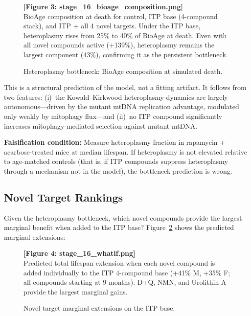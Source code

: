 \documentclass[11pt]{article}
\begin{document}
\begin{figure}[ht]
\centering
\textbf{[Figure 3: stage\_16\_bioage\_composition.png]}\\[4pt]
\small BioAge composition at death for control, ITP base (4-compound stack), and ITP + all 4 novel targets. Under the ITP base, heteroplasmy rises from 25\% to 40\% of BioAge at death. Even with all novel compounds active (+139\%), heteroplasmy remains the largest component (43\%), confirming it as the persistent bottleneck.
\caption{Heteroplasmy bottleneck: BioAge composition at simulated death.}
\label{fig:bottleneck}
\end{figure}

This is a structural prediction of the model, not a fitting artifact. It follows from two features: (i)~the Kowald--Kirkwood heteroplasmy dynamics are largely autonomous---driven by the mutant mtDNA replication advantage, modulated only weakly by mitophagy flux---and (ii)~no ITP compound significantly increases mitophagy-mediated selection against mutant mtDNA.

\textbf{Falsification condition:} Measure heteroplasmy fraction in rapamycin + acarbose-treated mice at median lifespan. If heteroplasmy is not elevated relative to age-matched controls (that is, if ITP compounds suppress heteroplasmy through a mechanism not in the model), the bottleneck prediction is wrong.

\subsection{Novel Target Rankings}

Given the heteroplasmy bottleneck, which novel compounds provide the largest marginal benefit when added to the ITP base? Figure~\ref{fig:whatif} shows the predicted marginal extensions:

\begin{figure}[ht]
\centering
\textbf{[Figure 4: stage\_16\_whatif.png]}\\[4pt]
\small Predicted total lifespan extension when each novel compound is added individually to the ITP 4-compound base (+41\% M, +35\% F; all compounds starting at 9 months). D+Q, NMN, and Urolithin A provide the largest marginal gains.
\caption{Novel target marginal extensions on the ITP base.}
\label{fig:whatif}
\end{figure}
\end{document}
